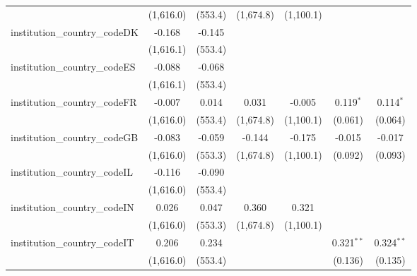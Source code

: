 \begin{tabular}{lcccccc}
                                         & (1,616.0)      & (553.4)        & (1,674.8)     & (1,100.1)     &              &   \\   
   institution\_country\_codeDK          & -0.168         & -0.145         &               &               &              &   \\   
                                         & (1,616.1)      & (553.4)        &               &               &              &   \\   
   institution\_country\_codeES          & -0.088         & -0.068         &               &               &              &   \\   
                                         & (1,616.1)      & (553.4)        &               &               &              &   \\   
   institution\_country\_codeFR          & -0.007         & 0.014          & 0.031         & -0.005        & 0.119$^{*}$  & 0.114$^{*}$\\   
                                         & (1,616.0)      & (553.4)        & (1,674.8)     & (1,100.1)     & (0.061)      & (0.064)\\   
   institution\_country\_codeGB          & -0.083         & -0.059         & -0.144        & -0.175        & -0.015       & -0.017\\   
                                         & (1,616.0)      & (553.3)        & (1,674.8)     & (1,100.1)     & (0.092)      & (0.093)\\   
   institution\_country\_codeIL          & -0.116         & -0.090         &               &               &              &   \\   
                                         & (1,616.0)      & (553.4)        &               &               &              &   \\   
   institution\_country\_codeIN          & 0.026          & 0.047          & 0.360         & 0.321         &              &   \\   
                                         & (1,616.0)      & (553.3)        & (1,674.8)     & (1,100.1)     &              &   \\   
   institution\_country\_codeIT          & 0.206          & 0.234          &               &               & 0.321$^{**}$ & 0.324$^{**}$\\   
                                         & (1,616.0)      & (553.4)        &               &               & (0.136)      & (0.135)\\   

\end{tabular}
